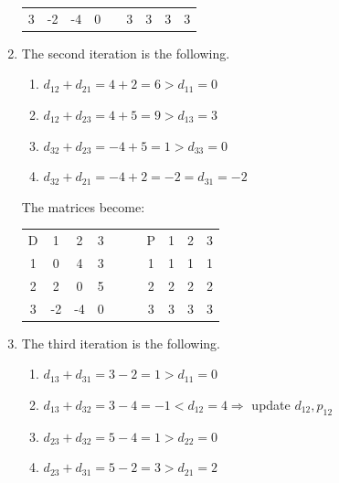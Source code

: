 \documentclass[12pt, a4paper]{report}
\newtheorem[style=M,bodystyle=\normalfont]{theorem}{Theorem}
\newtheorem[style=M,bodystyle=\normalfont]{corollary}{Corollary}
\newtheorem[style=M,bodystyle=\normalfont]{lemma}{Lemma}
\newtheorem[style=M,bodystyle=\normalfont]{definition}{Definition}
\begin{document}
\begin{enumerate}
\begin{table}[H]
\begin{tabular}{c|ccccc|ccc}
                    3 & -2       & -4       & 0          &                & 3 & 3 & 3 & 3  \\ 
                    \end{tabular}
                \end{table}
            \item The second iteration is the following. 
                \begin{enumerate}
                    \item $d_{12} + d_{21} = 4 + 2 = 6 > d_{11} = 0$
                    \item $d_{12} + d_{23} = 4 + 5 = 9 > d_{13} = 3$
                    \item $d_{32} + d_{23} = -4 + 5 = 1 > d_{33} = 0$
                    \item $d_{32} + d_{21} = -4 + 2 = -2 = d_{31} = -2$
                \end{enumerate}
                The matrices become: 
                \begin{table}[H]
                    \centering
                    \begin{tabular}{c|ccccc|ccc}
                    D & 1        & 2        & 3          & $\:\:\:\:\:\:$ & P & 1 & 2 & 3  \\ \cline{1-4} \cline{6-9} 
                    1 & 0        & 4        & 3          &                & 1 & 1 & 1 & 1  \\
                    2 & 2        & 0        & 5          &                & 2 & 2 & 2 & 2  \\
                    3 & -2       & -4       & 0          &                & 3 & 3 & 3 & 3  \\ 
                    \end{tabular}
                \end{table}
            \item The third iteration is the following. 
                \begin{enumerate}
                    \item $d_{13} + d_{31} = 3 - 2 = 1 > d_{11} = 0$
                    \item $d_{13} + d_{32} = 3 - 4 = -1 < d_{12} = 4 \Rightarrow$ update $d_{12}, p_{12}$
                    \item $d_{23} + d_{32} = 5 - 4 = 1 > d_{22} = 0$
                    \item $d_{23} + d_{31} = 5 - 2 = 3 > d_{21} = 2$
                \end{enumerate}

\end{enumerate}
\end{document}
